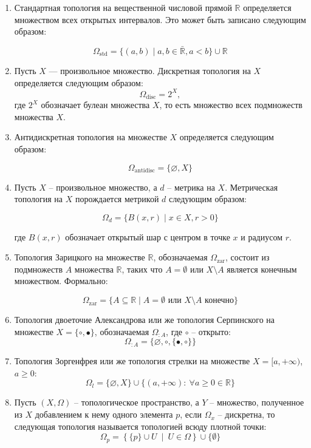 \begin{example}
	\begin{enumerate}
		
		\item Стандартная топология на вещественной числовой прямой $\mathbb{R}$ определяется множеством всех открытых интервалов. Это может быть записано следующим образом:

		\[
		\Omega_{\text{std}} = \{ (a, b) \mid a, b \in \bar{\mathbb{R}}, a < b \} \cup \mathbb{R}
		\]

		\item Пусть $X$ — произвольное множество. Дискретная топология на $X$ определяется следующим образом:  
		\[
		\Omega_{\text{disc}} = 2^X,
		\]  
		где $2^X$ обозначает булеан множества $X$, то есть множество всех подмножеств множества $X$.  
		

		\item Антидискретная топология на множестве \(X\) определяется следующим образом:

		\[
		\Omega_{\text{antidisc}} = \{ \varnothing, X\}
		\]
		
		\item Пусть \(X\) -- произвольное множество, а \(d\) -- метрика на \(X\). Метрическая топология на \(X\) порождается метрикой \(d\) следующим образом:

		\[
		\Omega_d = \{ B(x, r) \mid x \in X, r > 0 \}
		\]
		
		где \(B(x, r)\) обозначает открытый шар с центром в точке \(x\) и радиусом \(r\).
		
		\item  Топология Зарицкого на множестве \(\mathbb{R}\), обозначаемая \(\Omega_{\text{zar}}\), состоит из подмножеств \(A\) множества \(\mathbb{R}\), таких что \(A = \emptyset\) или \(X \setminus A\) является конечным множеством. Формально:

		\[
		\Omega_{\text{zar}} = \{ A \subseteq \mathbb{R} \mid A = \emptyset \text{ или } X \setminus A \text{ конечно} \}
		\]

		\item Топология двоеточие Александрова или же топология Серпинского на множестве \(X = \{\circ, \bullet\}\), обозначаемая \(\Omega_{:A}\), где \(\circ\) -- открыто:
		\[
			\Omega_{:A} = \{\varnothing, \circ, \{\bullet, \circ\}\}
		\]

		\item Топология Зоргенфрея или же топология стрелки на множестве \(X = [a, +\infty)\), \(a \geq 0\):
		\[
			\Omega_{l} = \{\varnothing, X\} \cup \{(a, +\infty): \ \forall a \geq 0 \in \mathbb{R}\}
		\]
		\item Пусть $(X, \Omega)$ -- топологическое пространство, а $Y$ -- множество, полученное из $X$ добавлением к нему одного элемента $p$, если \(\Omega_x\) -- дискретна, то следующая топология называется топологией всюду плотной точки:
		\[
			\Omega_p = \left\{ \{p\} \cup U \ \middle| \ U \in \Omega \right\} \cup \{ \emptyset \}	
		\]
	\end{enumerate}
\end{example}

